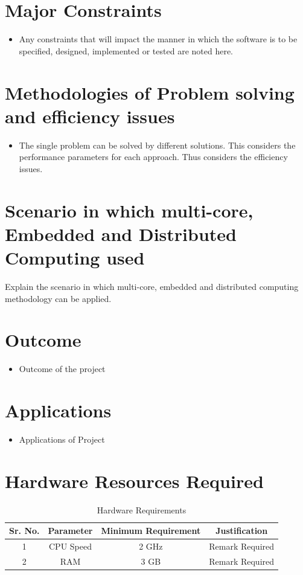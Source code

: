 \documentclass[oneside,a4paper,12pt]{report}
\begin{document}
\section{Major Constraints}
\begin{itemize}
\item Any constraints that will impact the manner in which the software is to be specified, designed, implemented or tested are noted here.
\end{itemize}

\section{Methodologies of Problem solving and efficiency issues}
\begin{itemize}
	\item The single problem can be solved by different solutions.  This considers the performance parameters for each approach. Thus considers the efficiency issues.
\end{itemize}

\section{Scenario in which multi-core, Embedded and Distributed Computing used}
 Explain the scenario in which multi-core, embedded and distributed computing methodology can be applied.


\section{Outcome}
\begin{itemize}
\item Outcome of the project
\end{itemize}

\section{Applications}
\begin{itemize}
\item Applications of Project
\end{itemize}

\section{Hardware Resources Required}
\begin{table}[!htbp]
\begin{center}
\def\arraystretch{1.5}
  \begin{tabular}{| c | c | c | c |}
\hline
Sr. No. &	Parameter &	Minimum Requirement & Justification \\
\hline
1 &	CPU Speed &	 2 GHz  & Remark Required\\
\hline
2 &	RAM  &	3 GB &  Remark Required\\
 \hline
\end{tabular}
 \caption { Hardware Requirements }
 \label{tab:hreq}
\end{center}

\end{table}
\end{document}
